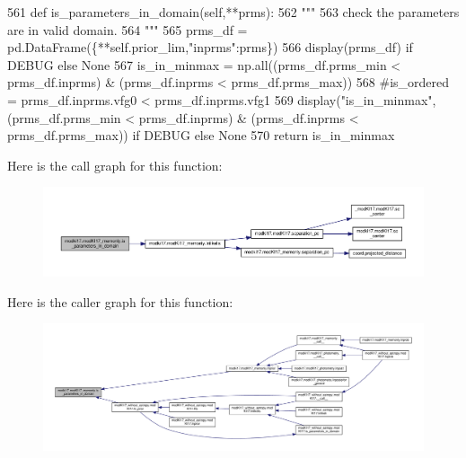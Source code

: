 \begin{DoxyCode}
561     \textcolor{keyword}{def }is\_parameters\_in\_domain(self,**prms):
562         \textcolor{stringliteral}{"""}
563 \textcolor{stringliteral}{        check the parameters are in valid domain.}
564 \textcolor{stringliteral}{        """}
565         prms\_df = pd.DataFrame(\{**self.prior\_lim,\textcolor{stringliteral}{"inprms"}:prms\})
566         display(prms\_df) \textcolor{keywordflow}{if} DEBUG \textcolor{keywordflow}{else} \textcolor{keywordtype}{None}
567         is\_in\_minmax = np.all((prms\_df.prms\_min < prms\_df.inprms) & (prms\_df.inprms < prms\_df.prms\_max))
568         \textcolor{comment}{#is\_ordered = prms\_df.inprms.vfg0 < prms\_df.inprms.vfg1}
569         display(\textcolor{stringliteral}{"is\_in\_minmax"},(prms\_df.prms\_min < prms\_df.inprms) & (prms\_df.inprms < prms\_df.prms\_max)) \textcolor{keywordflow}{
      if} DEBUG \textcolor{keywordflow}{else} \textcolor{keywordtype}{None}
570         \textcolor{keywordflow}{return} is\_in\_minmax
\end{DoxyCode}
Here is the call graph for this function\+:\nopagebreak
\begin{figure}[H]
\begin{center}
\leavevmode
\includegraphics[width=350pt]{df/da2/classmodki17_1_1modKI17__memonly_a32029497de5993152e902e6cee8554c9_cgraph}
\end{center}
\end{figure}
Here is the caller graph for this function\+:\nopagebreak
\begin{figure}[H]
\begin{center}
\leavevmode
\includegraphics[width=350pt]{df/da2/classmodki17_1_1modKI17__memonly_a32029497de5993152e902e6cee8554c9_icgraph}
\end{center}
\end{figure}
\mbox{\label{classmodki17_1_1modKI17__memonly_acd5664cdd71217fd6cdd195907ba79a1}} 
